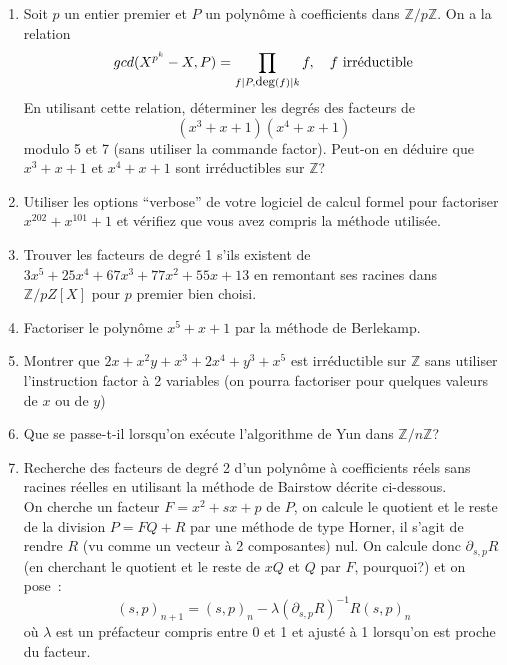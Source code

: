 \documentclass[a4paper,11pt]{article}
\newcommand{\Z}{{\mathbb{Z}}}
\begin{document}
\begin{giacjshere}
\begin{enumerate}
qui calcule une racine d'un polynôme à coefficients complexes
en utilisant une méthode itérative de type méthode de Newton 
(avec éventuellement un préfacteur lorsqu'on débute la recherche).
Les polynômes seront représentés par la liste de leurs coefficients
et l'évaluation faite par la méthode de Horner.
Trouver ensuite toutes les racines du polynôme en éliminant la
racine trouvée (toujours avec Horner). Trouver les combinaisons
de racines correspondant à un facteur à coefficients entiers.
\item Soit $p$ un entier premier et $P$ un polynôme \`a
coefficients dans $\Z/p\Z$. On a la relation
\[ gcd(X^{p^k}-X,P) = \prod_{ f | P, \mbox{\small deg}(f) | k} f, 
\quad f \mbox{ irréductible} \]
En utilisant cette relation, 
déterminer les degrés des facteurs de 
\[ (x^3+x+1)(x^4+x+1) \]
modulo 5 et 7 (sans utiliser la commande factor). 
Peut-on en déduire que $x^3+x+1$ et
$x^4+x+1$ sont irréductibles sur $\Z$?
\item Utiliser les options ``verbose'' de votre logiciel de calcul formel
pour factoriser $x^{202}+x^{101}+1$ et vérifiez que vous avez compris
la méthode utilisée.
\item Trouver les facteurs de degré 1 s'ils existent de
$3x^5+25x^4+67x^3+77x^2+55x+13$ en remontant ses racines
dans $\Z/pZ[X]$ pour $p$ premier bien choisi.
\item Factoriser le polynôme $x^5+x+1$ par la méthode 
de Berlekamp.
\item Montrer que $2x+x^2y+x^3+2x^4+y^3+x^5$ est irréductible sur $\Z$
sans utiliser l'instruction factor à 2 variables (on pourra factoriser 
pour quelques valeurs de $x$ ou de $y$)

\item Que se passe-t-il lorsqu'on ex\'ecute l'algorithme de Yun
dans $\Z/n\Z$?

\item Recherche des facteurs de degré 2 d'un polynôme à coefficients
réels sans racines réelles en utilisant la méthode de Bairstow décrite
ci-dessous.\\
On cherche un facteur $F=x^2+sx+p$ de $P$, on calcule le quotient et le reste
de la division $P=FQ+R$ par une méthode de type Horner, il s'agit de 
rendre $R$ (vu comme un vecteur à 2 composantes) nul. On calcule
donc $\partial_{s,p} R$ (en cherchant le quotient et le reste
de $xQ$ et $Q$ par $F$, pourquoi?) et on pose~:
\[(s,p)_{n+1}=(s,p)_n- \lambda (\partial_{s,p} R)^{-1} R (s,p)_n\]
où $\lambda$ est un préfacteur compris entre 0 et 1 et ajusté à 1 
lorsqu'on est proche du facteur.



\end{enumerate}
\end{giacjshere}
\end{document}
